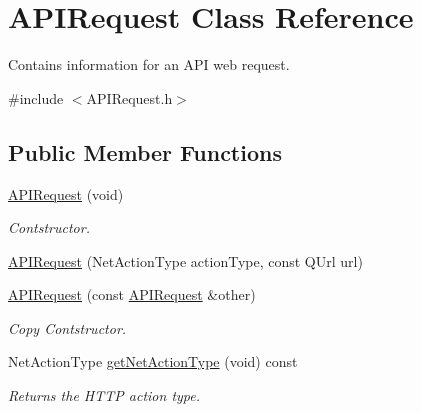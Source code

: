 \hypertarget{class_a_p_i_request}{}\section{A\+P\+I\+Request Class Reference}
\label{class_a_p_i_request}


Contains information for an A\+PI web request.  




{\ttfamily \#include $<$A\+P\+I\+Request.\+h$>$}

\subsection*{Public Member Functions}
\begin{DoxyCompactItemize}
\item 
\mbox{\label{class_a_p_i_request_aa1b6f8f309547967edbfc2f6636df3a4}} 
\hyperlink{class_a_p_i_request_aa1b6f8f309547967edbfc2f6636df3a4}{A\+P\+I\+Request} (void)
\begin{DoxyCompactList}\small\item\em Contstructor. \end{DoxyCompactList}\item 
\hyperlink{class_a_p_i_request_a5c6b7f4e52cf0d36bd3bb2280ab59331}{A\+P\+I\+Request} (Net\+Action\+Type action\+Type, const Q\+Url url)
\item 
\mbox{\label{class_a_p_i_request_a0b237561a193b67440be9787117f90d1}} 
\hyperlink{class_a_p_i_request_a0b237561a193b67440be9787117f90d1}{A\+P\+I\+Request} (const \hyperlink{class_a_p_i_request}{A\+P\+I\+Request} \&other)
\begin{DoxyCompactList}\small\item\em Copy Contstructor. \end{DoxyCompactList}\item 
\mbox{\label{class_a_p_i_request_ae2d4cf9cce8e40de3158b681d4402551}} 
Net\+Action\+Type \hyperlink{class_a_p_i_request_ae2d4cf9cce8e40de3158b681d4402551}{get\+Net\+Action\+Type} (void) const
\begin{DoxyCompactList}\small\item\em Returns the H\+T\+TP action type. \end{DoxyCompactList}\item 
\mbox{\label{class_a_p_i_request_ab4f5dc1d54250fc927872cfcc59cc3cc}} 

\end{DoxyCompactItemize}
